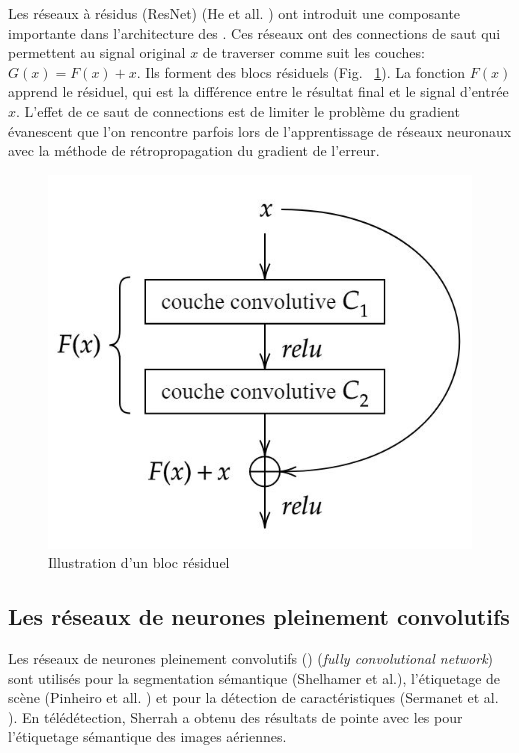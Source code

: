 Les réseaux à résidus (ResNet) (He et all. \cite{He2015DelvingDI}) ont introduit une composante importante dans l’architecture des \acrconvnetns.  Ces réseaux ont des connections de saut qui permettent au signal original $x$ de traverser comme suit les couches: $G(x)=F(x)+x$. Ils forment des blocs résiduels (Fig. ~\ref{fig:resnet-block-diagram}).  La fonction $F(x)$ apprend le résiduel, qui est la différence entre le résultat final et le signal d’entrée $x$. L'effet de ce saut de connections est de limiter le problème du gradient évanescent que l'on rencontre parfois lors de l'apprentissage de réseaux neuronaux avec la méthode de rétropropagation du gradient de l'erreur. 

\begin{figure}[!htbp] 
  \includegraphics[width=0.30\linewidth]{figures/resnet-block-diagram.jpg}
   \caption{\small{Illustration d'un bloc résiduel}}
  \label{fig:resnet-block-diagram}
\end{figure}

\subsection{Les réseaux de neurones pleinement convolutifs}

Les réseaux de neurones pleinement convolutifs (\acrfcnns) (\textit{fully convolutional network}) sont utilisés pour la segmentation sémantique (Shelhamer et al.\cite{Shelhamer2017}), l'étiquetage de scène (Pinheiro et all. \cite{Pinheiro2013RecurrentCN}) et pour la détection de caractéristiques (Sermanet et al. \cite{Sermanet2013OverFeatIR}). En télédétection, Sherrah \cite{Sherrah2016FullyCN} a obtenu des résultats de pointe avec les \acrfcn pour l'étiquetage sémantique des images aériennes. 

